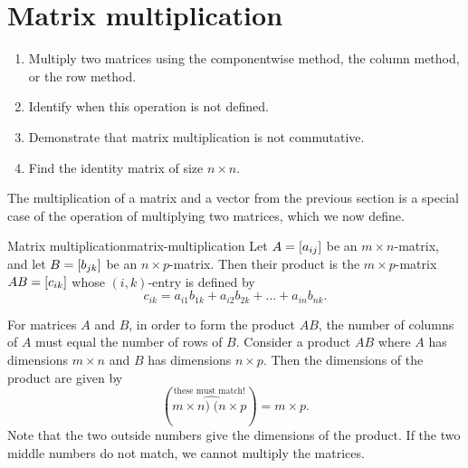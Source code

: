 \section{Matrix multiplication}

\begin{outcome}
  \begin{enumerate}
  \item Multiply two matrices using the componentwise method, the
    column method, or the row method.
  \item Identify when this operation is not defined.
  \item Demonstrate that matrix multiplication is not commutative.
  \item Find the identity matrix of size $n\times n$.
  \end{enumerate}
\end{outcome}

The multiplication of a matrix and a vector from the previous section
is a special case of the operation of multiplying two matrices, which
we now define.

\begin{definition}{Matrix multiplication}{matrix-multiplication}
  Let $A=\left[a_{ij}\right]$ be an $m\times n$-matrix, and let
  $B=\left[b_{jk}\right]$ be an $n\times p$-matrix. Then their product%
   is the
  $m\times p$-matrix $AB=\left[c_{ik}\right]$ whose $(i,k)$-entry is defined
  by
  \begin{equation*}
    c_{ik} = a_{i1}b_{1k} + a_{i2}b_{2k} + \ldots + a_{in}b_{nk}.
  \end{equation*}
\end{definition}

For matrices $A$ and $B$, in order to form the product $AB$, the
number of columns of $A$ must equal the number of rows of
$B$. Consider a product $AB$ where $A$ has dimensions $m\times n$ and
$B$ has dimensions $n \times p$. Then the dimensions of the product
are given by
\begin{equation*}
  (\overset{\text{these must match!}}{m\times\widehat{n)\;(n}\times p})=m\times p.
\end{equation*}
Note that the two outside numbers give the dimensions of the
product. If the two middle numbers do not match, we cannot multiply
the matrices.

